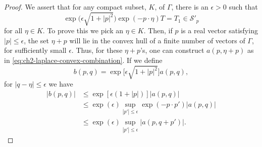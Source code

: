 \begin{proof}
We assert that for any compact subset, $K$, of $\Gamma$, there is an
$\epsilon>0$ such that
\begin{equation}
  \exp\bigl(\epsilon\sqrt{1+|p|^2}\bigr)
  \exp(-p\cdot\eta)T=T_1\in\mathcal{S}'_p
  \tag{2-70}\label{eq:ch2-laplace-fast-decrease}
\end{equation}
for all $\eta\in K$.  To prove this we pick an $\eta\in K$.  Then, if
$p$ is a real vector satisfying $|p|\leq\epsilon$, the set $\eta+p$ will
lie in the convex hull of a finite number of vectors of $\Gamma$, for
sufficiently small $\epsilon$.  Thus, for these $\eta+p$'s, one can
construct $a(p,\eta+p)$ as in \eqref{eq:ch2-laplace-convex-combination}.  If we define
\begin{equation*}
  b(p,q)=\exp\bigl[\epsilon\sqrt{1+|p|^2}\bigr]a(p,q),
\end{equation*}
for $|q-\eta|\leq\epsilon$ we have
\begin{align*}
  |b(p,q)|&\leq\exp[\epsilon(1+|p|)]|a(p,q)| \\
  &\leq\exp(\epsilon)\sup_{|p'|\leq\epsilon}
     \exp(-p\cdot p')|a(p,q)| \\
  &\leq\exp(\epsilon)\sup_{|p'|\leq\epsilon}|a(p,q+p')| .
\end{align*}


\end{proof}
